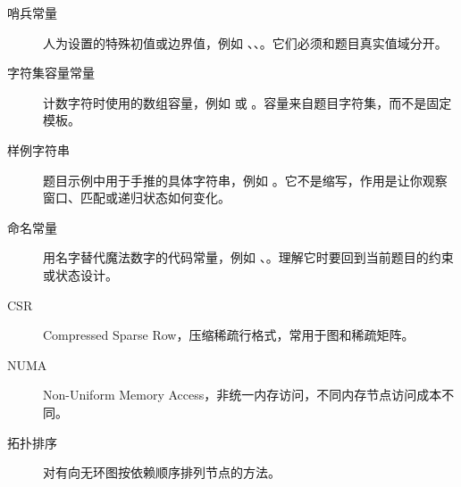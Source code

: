 \begin{description}
\item[哨兵常量] 人为设置的特殊初值或边界值，例如 、、。它们必须和题目真实值域分开。
\item[字符集容量常量] 计数字符时使用的数组容量，例如  或 。容量来自题目字符集，而不是固定模板。
\item[样例字符串] 题目示例中用于手推的具体字符串，例如 。它不是缩写，作用是让你观察窗口、匹配或递归状态如何变化。
\item[命名常量] 用名字替代魔法数字的代码常量，例如 、。理解它时要回到当前题目的约束或状态设计。
\item[CSR] Compressed Sparse Row，压缩稀疏行格式，常用于图和稀疏矩阵。
\item[NUMA] Non-Uniform Memory Access，非统一内存访问，不同内存节点访问成本不同。
\item[拓扑排序] 对有向无环图按依赖顺序排列节点的方法。
\end{description}
